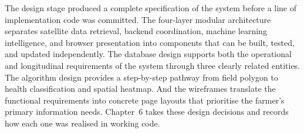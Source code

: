 The design stage produced a complete specification of the system before a line of implementation code was committed. The four-layer modular architecture separates satellite data retrieval, backend coordination, machine learning intelligence, and browser presentation into components that can be built, tested, and updated independently. The database design supports both the operational and longitudinal requirements of the system through three clearly related entities. The algorithm design provides a step-by-step pathway from field polygon to health classification and spatial heatmap. And the wireframes translate the functional requirements into concrete page layouts that prioritise the farmer's primary information needs. Chapter~6 takes these design decisions and records how each one was realised in working code.

